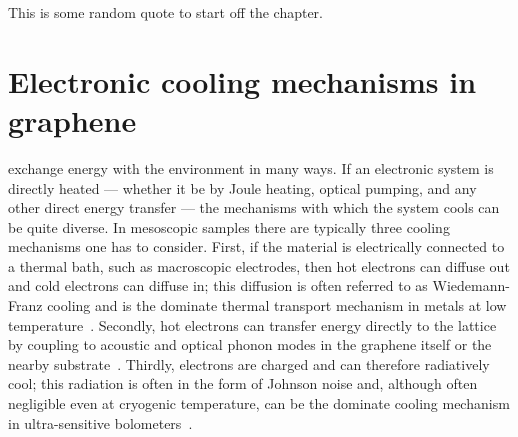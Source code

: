 \begin{savequote}[75mm]
This is some random quote to start off the chapter.
\end{savequote}

\chapter{Electronic cooling mechanisms in graphene}
\label{ch:electronic_cooling}
 exchange energy with the environment in many ways. If an electronic system is directly heated --- whether it be by Joule heating, optical pumping, and any other direct energy transfer --- the mechanisms with which the system cools can be quite diverse. In mesoscopic samples there are typically three cooling mechanisms one has to consider. First, if the material is electrically connected to a thermal bath, such as macroscopic electrodes, then hot electrons can diffuse out and cold electrons can diffuse in; this diffusion is often referred to as Wiedemann-Franz cooling and is the dominate thermal transport mechanism in metals at low temperature~\cite{kittle??}. Secondly, hot electrons can transfer energy directly to the lattice by coupling to acoustic and optical phonon modes in the graphene itself or the nearby substrate~\cite{??}. Thirdly, electrons are charged and can therefore radiatively cool; this radiation is often in the form of Johnson noise and, although often negligible even at cryogenic temperature, can be the dominate cooling mechanism in ultra-sensitive bolometers~\cite{prober, mckitterick}.


